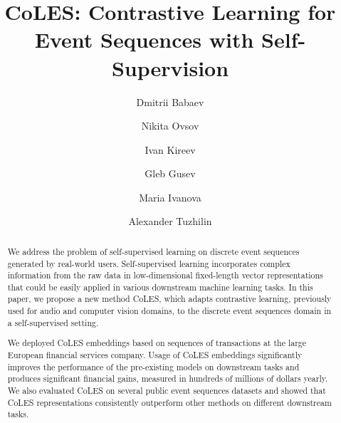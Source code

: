 \documentclass[sigconf, anonymous]{acmart}
\begin{document}
\title{CoLES: Contrastive Learning for Event Sequences with Self-Supervision}

\author{Dmitrii Babaev} 


\author{Nikita Ovsov} 

\author{Ivan Kireev} 

\author{Gleb Gusev}

\author{Maria Ivanova}

\author{Alexander Tuzhilin}

\begin{abstract}
We address the problem of self-supervised learning on discrete event sequences generated by real-world users. Self-supervised learning incorporates complex information from the raw data in low-dimensional fixed-length vector representations that could be easily applied in various downstream machine learning tasks. In this paper, we propose a new method CoLES, which adapts contrastive learning, previously used for audio and computer vision domains, to the discrete event sequences domain in a self-supervised setting.

We deployed CoLES embeddings based on sequences of transactions at the large European financial services company. Usage of CoLES embeddings significantly improves the performance of the pre-existing models on downstream tasks and produces significant financial gains, measured in hundreds of millions of dollars yearly.
We also evaluated CoLES on several public event sequences datasets and showed that CoLES representations consistently outperform other methods on different downstream tasks.
\end{abstract}
\end{document}
